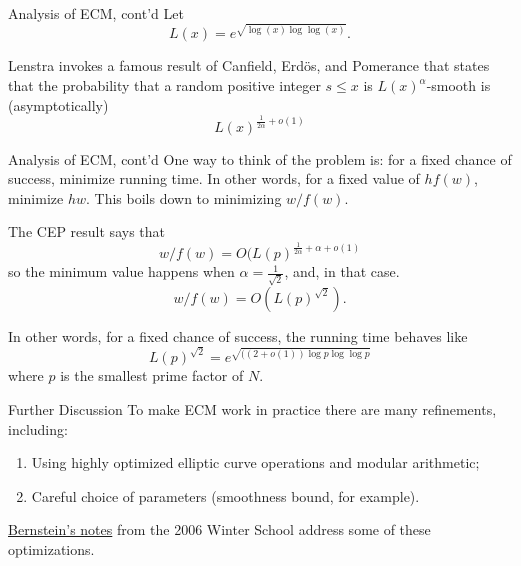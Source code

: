 \documentclass{beamer}
\begin{document}
\begin{frame}{Analysis of ECM, cont'd}
Let $$
L(x)=e^{\sqrt{\log(x)\log\log(x)}}.
$$

\bigskip\noindent
Lenstra invokes a famous result of Canfield, Erd\"{o}s, and Pomerance that states that the probability that a random positive integer
$s\le x$  is $L(x)^{\alpha}$-smooth is (asymptotically) 
$$
L(x)^{\frac{1}{2\alpha}+o(1)}
$$
\end{frame}
\begin{frame}{Analysis of ECM, cont'd}
One way to think of the problem is: for a fixed chance of success, minimize running time.  In other words,
for a fixed value of $hf(w)$, minimize $hw$.  This boils down to minimizing $w/f(w)$.

\bigskip\noindent
The CEP result says that
$$
w/f(w)= O(L(p)^{\frac{1}{2\alpha}+\alpha+o(1)}
$$
so the minimum value happens when $\alpha=\frac{1}{\sqrt{2}}$, and, in that case.
$$
w/f(w)=O(L(p)^{\sqrt{2}}).
$$

\bigskip\noindent
In other words, for a fixed chance of success, the running time behaves like
$$
L(p)^{\sqrt{2}}=e^{\sqrt{((2+o(1))\log p\log\log p}}
$$
where $p$ is the smallest prime factor of $N$.
\end{frame}
\begin{frame}{Further Discussion}
To make ECM work in practice there are many refinements, including:
\begin{enumerate}
\item Using highly optimized elliptic curve operations and modular arithmetic;
\item Careful choice of parameters (smoothness bound, for example).
\end{enumerate}

\href{http://swc.math.arizona.edu/aws/2006/notes.html}{Bernstein's notes} from the 2006 Winter School address some of these optimizations.
\end{frame}
\end{document}
